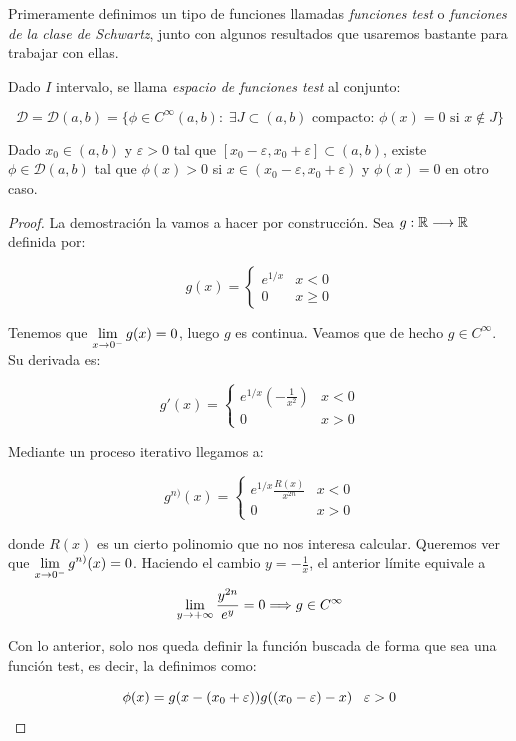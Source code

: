 Primeramente definimos un tipo de funciones llamadas \textit{funciones test} o \textit{funciones de la clase de Schwartz}, junto con algunos resultados que usaremos bastante para trabajar con ellas.

\begin{definition}
\label{funcionestest}
Dado $I$ intervalo, se llama \textit{espacio de funciones test} al conjunto:

\[
\mathcal{D} = \mathcal{D}(a,b) = \{\phi\in C^{\infty}(a,b): \; \exists J\subset(a,b) \text{ compacto: } \phi(x)=0 \text{ si } x \notin J\}
\]
\end{definition}

\begin{lemma}
\label{existenciaphi}
Dado $x_0\in(a,b)$ y $\varepsilon>0$ tal que $[x_0-\varepsilon, x_0+\varepsilon]\subset(a,b)$, existe $\phi\in\mathcal{D}(a,b)$ tal que $\phi(x)>0$ si $x\in(x_0-\varepsilon,x_0+\varepsilon)$ y $\phi(x)=0$ en otro caso.
\end{lemma}

\begin{proof}
La demostración la vamos a hacer por construcción. Sea $g : \mathbb{R} \longrightarrow \mathbb{R}$ definida por:

\[
g(x)=\left\{
\begin{array}{cc}
e^{1/x} & x<0 \\
0 & x\geq 0

\end{array}
\right.
\]

Tenemos que $\displaystyle\lim_{ x \to 0^- } g(x)=0$, luego $g$ es continua. Veamos que de hecho $g\in C^{\infty}$. Su derivada es:

\[
g'(x)=\left\{
\begin{array}{cc}
e^{1/x}\left(-\frac{1}{x^2}\right) & x<0 \\
0 & x> 0

\end{array}
\right.
\]

Mediante un proceso iterativo llegamos a:

\[
g^{n)}(x)=\left\{
\begin{array}{cc}
e^{1/x}\frac{R(x)}{x^{2n}} & x<0 \\
0 & x> 0

\end{array}
\right.
\]

donde $R(x)$ es un cierto polinomio que no nos interesa calcular. Queremos ver que $\displaystyle\lim_{ x \to 0^- } g^{n)}(x)=0$. Haciendo el cambio $y=-\frac{1}{x}$, el anterior límite equivale a 
\[
\displaystyle\lim_{ y \to +\infty } \frac{y^{2n}}{e^y}=0 \Longrightarrow g\in C^{\infty}
\]

Con lo anterior, solo nos queda definir la función buscada de forma que sea una función test, es decir, la definimos como:

\[
\phi(x)=g(x-(x_0+\varepsilon))g((x_0-\varepsilon)-x) \;\;\; \varepsilon>0 
\]

\end{proof}


